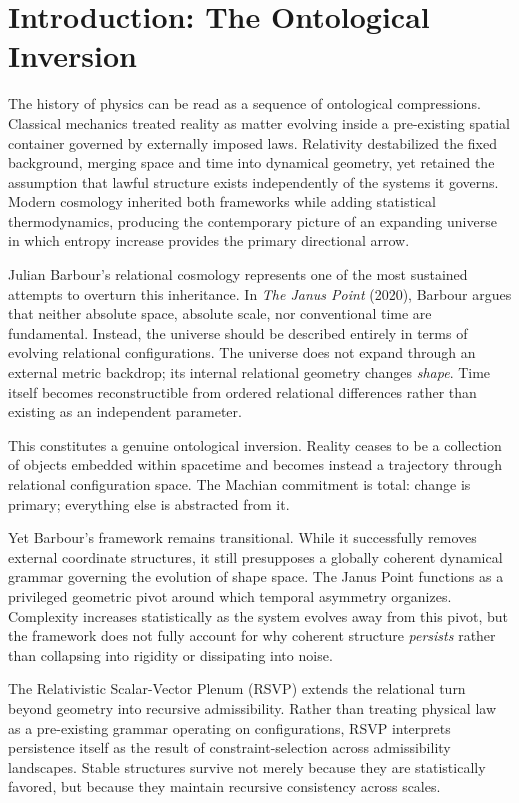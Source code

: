 \documentclass[12pt, a4paper]{article}
\begin{document}
\newpage
\setcounter{page}{1}

\section{Introduction: The Ontological Inversion}

The history of physics can be read as a sequence of ontological compressions.
Classical mechanics treated reality as matter evolving inside a pre-existing
spatial container governed by externally imposed laws. Relativity destabilized
the fixed background, merging space and time into dynamical geometry, yet
retained the assumption that lawful structure exists independently of the
systems it governs. Modern cosmology inherited both frameworks while adding
statistical thermodynamics, producing the contemporary picture of an
expanding universe in which entropy increase provides the primary directional
arrow.

Julian Barbour's relational cosmology represents one of the most sustained
attempts to overturn this inheritance. In \textit{The Janus Point} (2020),
Barbour argues that neither absolute space, absolute scale, nor conventional
time are fundamental. Instead, the universe should be described entirely in
terms of evolving relational configurations. The universe does not expand
through an external metric backdrop; its internal relational geometry changes
\emph{shape}. Time itself becomes reconstructible from ordered relational
differences rather than existing as an independent parameter.

This constitutes a genuine ontological inversion. Reality ceases to be a
collection of objects embedded within spacetime and becomes instead a
trajectory through relational configuration space. The Machian commitment is
total: change is primary; everything else is abstracted from it.

Yet Barbour's framework remains transitional. While it successfully removes
external coordinate structures, it still presupposes a globally coherent
dynamical grammar governing the evolution of shape space. The Janus Point
functions as a privileged geometric pivot around which temporal asymmetry
organizes. Complexity increases statistically as the system evolves away from
this pivot, but the framework does not fully account for why coherent
structure \emph{persists} rather than collapsing into rigidity or
dissipating into noise.

The Relativistic Scalar-Vector Plenum (RSVP) extends the relational turn
beyond geometry into recursive admissibility. Rather than treating physical
law as a pre-existing grammar operating on configurations, RSVP interprets
persistence itself as the result of constraint-selection across admissibility
landscapes. Stable structures survive not merely because they are
statistically favored, but because they maintain recursive consistency across
scales.
\end{document}
